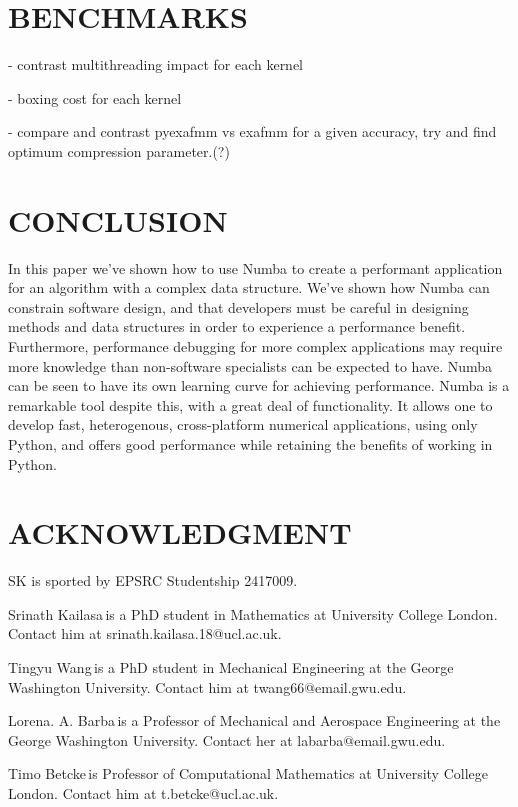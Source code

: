 \documentclass{IEEEcsmag}
\begin{document}
\section{BENCHMARKS}

- contrast multithreading impact for each kernel

- boxing cost for each kernel

- compare and contrast pyexafmm vs exafmm for a given accuracy, try and find optimum compression parameter.(?)

\section{CONCLUSION}

In this paper we've shown how to use Numba to create a performant application for an algorithm with a complex data structure. We've shown how Numba can constrain software design, and that developers must be careful in designing methods and data structures in order to experience a performance benefit. Furthermore, performance debugging for more complex applications may require more knowledge than non-software specialists can be expected to have. Numba can be seen to have its own learning curve for achieving performance. Numba is a remarkable tool despite this, with a great deal of functionality. It allows one to develop fast, heterogenous, cross-platform numerical applications, using only Python, and offers good performance while retaining the benefits of working in Python.

\section{ACKNOWLEDGMENT}

SK is sported by EPSRC Studentship 2417009.





\begin{IEEEbiography}{Srinath Kailasa}{\,}is a PhD student in Mathematics at University College London. Contact him at srinath.kailasa.18@ucl.ac.uk.
\end{IEEEbiography}

\begin{IEEEbiography}{Tingyu Wang}{\,}is a PhD student in Mechanical Engineering at the George Washington University. Contact him at twang66@email.gwu.edu.
\end{IEEEbiography}

\begin{IEEEbiography}{Lorena. A. Barba}{\,}is a Professor of Mechanical and Aerospace Engineering at the George Washington University.  Contact her at labarba@email.gwu.edu.
\end{IEEEbiography}

\begin{IEEEbiography}{Timo Betcke}{\,}is Professor of Computational Mathematics at University College London. Contact him at t.betcke@ucl.ac.uk.
\end{IEEEbiography}
\end{document}
